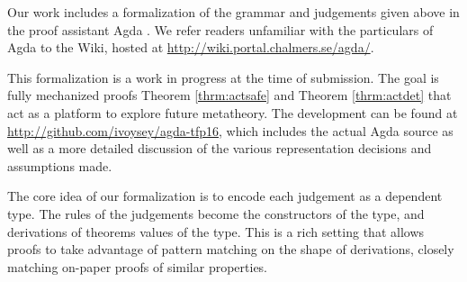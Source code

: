 Our work includes a formalization of the grammar and judgements given above
in the proof assistant Agda \cite{norell:thesis}. We refer readers
unfamiliar with the particulars of Agda to the Wiki, hosted
at \url{http://wiki.portal.chalmers.se/agda/}.

This formalization is a work in progress at the time of submission. The
goal is fully mechanized proofs Theorem \ref{thrm:actsafe} and
Theorem \ref{thrm:actdet} that act as a platform to explore future
metatheory. The development can be found at
\url{http://github.com/ivoysey/agda-tfp16}, which includes the actual Agda
source as well as a more detailed discussion of the various representation
decisions and assumptions made.

The core idea of our formalization is to encode each judgement as a
dependent type. The rules of the judgements become the constructors of the
type, and derivations of theorems values of the type. This is a rich
setting that allows proofs to take advantage of pattern matching on the
shape of derivations, closely matching on-paper proofs of similar
properties.
